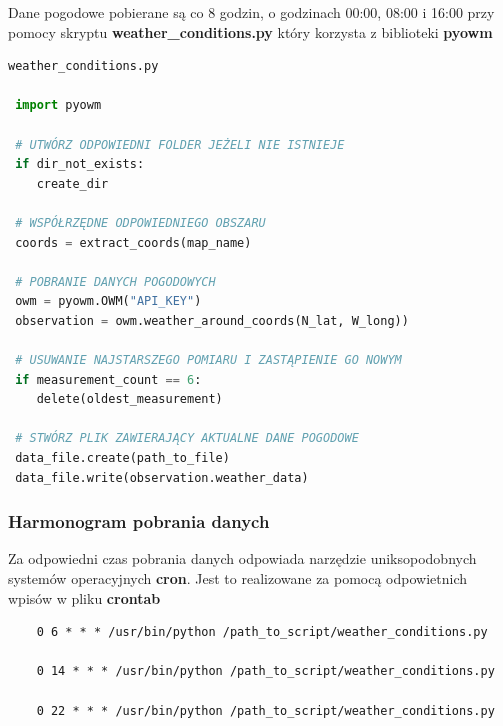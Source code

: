 Dane pogodowe pobierane są co 8 godzin, o godzinach 00:00, 08:00 i 16:00 przy pomocy skryptu \textbf{weather\_conditions.py} który korzysta z biblioteki \textbf{pyowm}
\begin{lstlisting}[language=Python,caption=pseudokod realizujący pobieranie danych pogodowych]
 weather_conditions.py
 
 import pyowm

 # UTWÓRZ ODPOWIEDNI FOLDER JEŻELI NIE ISTNIEJE
 if dir_not_exists:
 	create_dir
 	
 # WSPÓŁRZĘDNE ODPOWIEDNIEGO OBSZARU
 coords = extract_coords(map_name)
 
 # POBRANIE DANYCH POGODOWYCH
 owm = pyowm.OWM("API_KEY")
 observation = owm.weather_around_coords(N_lat, W_long))
 
 # USUWANIE NAJSTARSZEGO POMIARU I ZASTĄPIENIE GO NOWYM
 if measurement_count == 6:
 	delete(oldest_measurement)
 	
 # STWÓRZ PLIK ZAWIERAJĄCY AKTUALNE DANE POGODOWE
 data_file.create(path_to_file)
 data_file.write(observation.weather_data)
\end{lstlisting}

\subsubsection{Harmonogram pobrania danych}
Za odpowiedni czas pobrania danych odpowiada narzędzie uniksopodobnych systemów operacyjnych \textbf{cron}. Jest to realizowane za pomocą odpowietnich wpisów w pliku \textbf{crontab}
\begin{verbatim}
	0 6 * * * /usr/bin/python /path_to_script/weather_conditions.py

	0 14 * * * /usr/bin/python /path_to_script/weather_conditions.py
	
	0 22 * * * /usr/bin/python /path_to_script/weather_conditions.py	
\end{verbatim}


